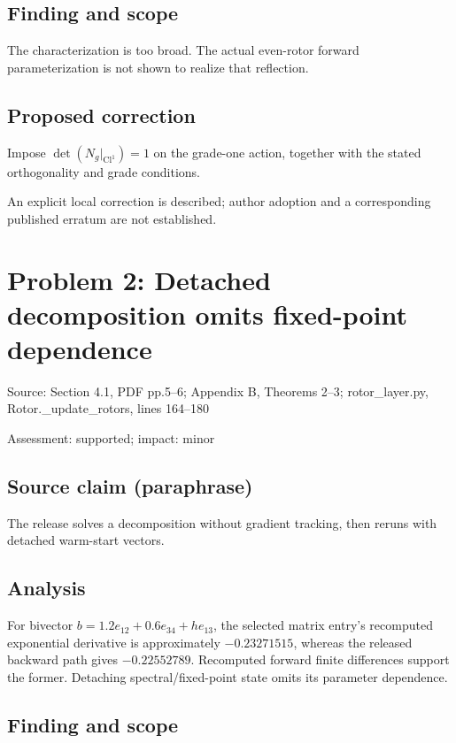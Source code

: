 \documentclass[11pt]{article}
\begin{document}
\subsection*{Finding and scope}

The characterization is too broad. The actual even-rotor forward parameterization is not shown to realize that reflection.

\subsection*{Proposed correction}

Impose \(\det(N_g|_{\mathrm{Cl}^1})=1\) on the grade-one action, together with the stated orthogonality and grade conditions.

An explicit local correction is described; author adoption and a corresponding published erratum are not established.

\section*{Problem 2: Detached decomposition omits fixed-point dependence}

Source: Section 4.1, PDF pp.5–6; Appendix B, Theorems 2–3; rotor\_layer.py, Rotor.\_update\_rotors, lines 164–180

Assessment: supported; impact: minor

\subsection*{Source claim (paraphrase)}

The release solves a decomposition without gradient tracking, then reruns with detached warm-start vectors.

\subsection*{Analysis}

For bivector \(b=1.2e_{12}+0.6e_{34}+he_{13}\), the selected matrix entry’s recomputed exponential derivative is approximately \(-0.23271515\), whereas the released backward path gives \(-0.22552789\). Recomputed forward finite differences support the former. Detaching spectral/fixed-point state omits its parameter dependence.

\subsection*{Finding and scope}
\end{document}
